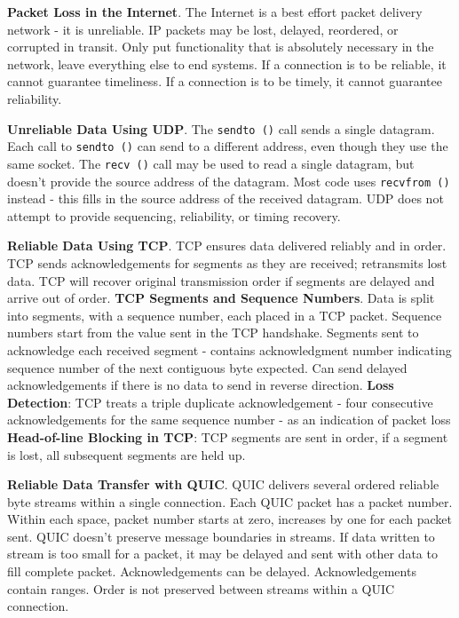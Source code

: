 \documentclass{article}
\begin{document}
\textbf{Packet Loss in the Internet}.
The Internet is a best effort packet delivery network {-} it is unreliable.
IP packets may be lost, delayed, reordered, or corrupted in transit.
Only put functionality that is absolutely necessary in the network, leave everything else to end systems.
If a connection is to be reliable, it cannot guarantee timeliness.
If a connection is to be timely, it cannot guarantee reliability.

\vspace{\baselineskip}
\textbf{Unreliable Data Using UDP}.
The \texttt{sendto ()} call sends a single datagram.
Each call to \texttt{sendto ()} can send to a different address, even though they use the same socket.
The \texttt{recv ()} call may be used to read a single datagram, but doesn't provide the source address of the datagram.
Most code uses \texttt{recvfrom ()} instead {-} this fills in the source address of the received datagram.
UDP does not attempt to provide sequencing, reliability, or timing recovery.

\vspace{\baselineskip}
\textbf{Reliable Data Using TCP}.
TCP ensures data delivered reliably and in order.
TCP sends acknowledgements for segments as they are received; retransmits lost data.
TCP will recover original transmission order if segments are delayed and arrive out of order.
\textbf{TCP Segments and Sequence Numbers}. Data is split into segments, with a sequence number, each placed in a TCP packet.
Sequence numbers start from the value sent in the TCP handshake.
Segments sent to acknowledge each received segment {-} contains acknowledgment number indicating sequence number of the next
contiguous byte expected.
Can send delayed acknowledgements if there is no data to send in reverse direction.
\textbf{Loss Detection}: TCP treats a triple duplicate acknowledgement {-} four consecutive acknowledgements for the same sequence
number {-} as an indication of packet loss
\textbf{Head-of-line Blocking in TCP}: TCP segments are sent in order, if a segment is lost, all subsequent segments are held up.

\vspace{\baselineskip}
\textbf{Reliable Data Transfer with QUIC}.
QUIC delivers several ordered reliable byte streams within a single connection.
Each QUIC packet has a packet number.
Within each space, packet number starts at zero, increases by one for each packet sent.
QUIC doesn’t preserve message boundaries in streams.
If data written to stream is too small for a packet, it may be
delayed and sent with other data to fill complete packet.
Acknowledgements can be delayed.
Acknowledgements contain ranges.
Order is not preserved between streams within a QUIC connection.
\end{document}
